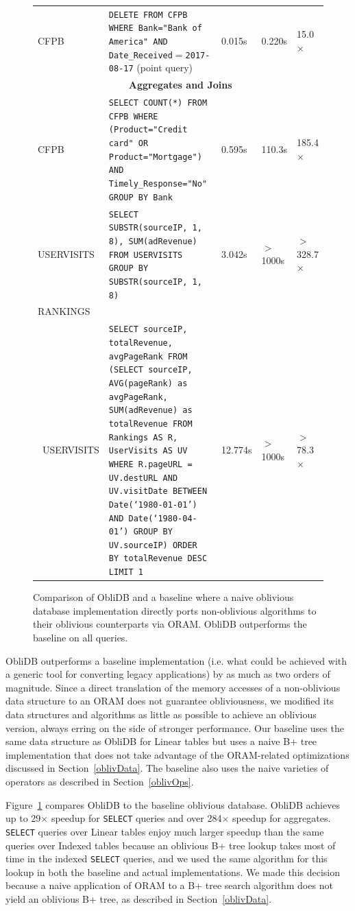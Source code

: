 \documentclass[letterpaper,twocolumn,10pt]{article}
\def\name/{ObliDB}
\begin{document}
\begin{figure}
\begin{tabular}{p{2.2cm} p{8cm} l l l}
CFPB & \texttt{DELETE FROM CFPB WHERE Bank="Bank of America" AND Date\_Received$=$2017-08-17} (point query)& 0.015s& 0.220s& 15.0$\times$ \\\rule{0pt}{2ex}
&\multicolumn{2}{c}{\textbf{Aggregates and Joins}}\\\rule{0pt}{2ex}
CFPB & \texttt{SELECT COUNT(*) FROM CFPB WHERE (Product="Credit card" OR Product="Mortgage") AND Timely\_Response="No" GROUP BY Bank}& 0.595s & 110.3s & 185.4$\times$\\\rule{0pt}{2ex}
USERVISITS & \texttt{SELECT SUBSTR(sourceIP, 1, 8), SUM(adRevenue) FROM USERVISITS GROUP BY SUBSTR(sourceIP, 1, 8)}& 3.042s &$>$1000s & $>$328.7$\times$\\\rule{0pt}{2ex}
RANKINGS \\\ USERVISITS  & \texttt{SELECT sourceIP, totalRevenue, avgPageRank
FROM
  (SELECT sourceIP,
          AVG(pageRank) as avgPageRank,
          SUM(adRevenue) as totalRevenue
    FROM Rankings AS R, UserVisits AS UV
    WHERE R.pageURL = UV.destURL
       AND UV.visitDate BETWEEN Date(`1980-01-01') AND Date(`1980-04-01')
    GROUP BY UV.sourceIP)
  ORDER BY totalRevenue DESC LIMIT 1} & 12.774s & $>$1000s& $>$78.3$\times$\\
\end{tabular}
\caption{Comparison of \name/ and a baseline where a naive oblivious database implementation directly ports non-oblivious algorithms to their oblivious counterparts via ORAM. \name/ outperforms the baseline on all queries.}
\label{figQueries}
\end{figure}
\name/ outperforms a baseline implementation (i.e. what could be achieved with a generic tool for converting legacy applications) by as much as two orders of magnitude.  Since a direct translation of the memory accesses of a non-oblivious data structure to an ORAM does not guarantee obliviousness, we modified its data structures and algorithms as little as possible to achieve an oblivious version, always erring on the side of stronger performance. Our baseline uses the same data structure as \name/ for Linear tables but uses a naive B+ tree implementation that does not take advantage of the ORAM-related optimizations discussed in Section~\ref{oblivData}. The baseline also uses the naive varieties of operators as described in Section~\ref{oblivOps}.

Figure~\ref{figQueries} compares \name/ to the baseline oblivious database. \name/ achieves up to 29$\times$ speedup for \texttt{SELECT} queries and over 284$\times$ speedup for aggregates. \texttt{SELECT} queries over Linear tables enjoy much larger speedup than the same queries over Indexed tables because an oblivious B+ tree lookup takes most of time in the indexed \texttt{SELECT} queries, and we used the same algorithm for this lookup in both the baseline and actual implementations. We made this decision because a naive application of ORAM to a B+ tree search algorithm does not yield an oblivious B+ tree, as described in Section~\ref{oblivData}.
\end{document}
